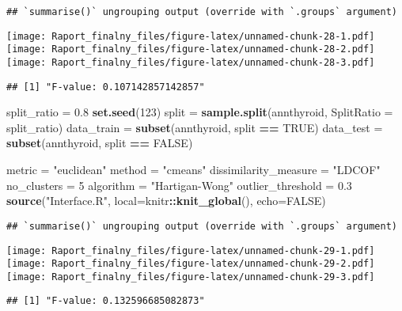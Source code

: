 \documentclass[
]{article}
\newenvironment{Shaded}{\begin{snugshade}}{\end{snugshade}}
\newcommand{\DataTypeTok}[1]{\textcolor[rgb]{0.13,0.29,0.53}{#1}}
\newcommand{\DecValTok}[1]{\textcolor[rgb]{0.00,0.00,0.81}{#1}}
\newcommand{\FloatTok}[1]{\textcolor[rgb]{0.00,0.00,0.81}{#1}}
\newcommand{\KeywordTok}[1]{\textcolor[rgb]{0.13,0.29,0.53}{\textbf{#1}}}
\newcommand{\NormalTok}[1]{#1}
\newcommand{\OperatorTok}[1]{\textcolor[rgb]{0.81,0.36,0.00}{\textbf{#1}}}
\newcommand{\OtherTok}[1]{\textcolor[rgb]{0.56,0.35,0.01}{#1}}
\newcommand{\StringTok}[1]{\textcolor[rgb]{0.31,0.60,0.02}{#1}}
\begin{document}
\begin{verbatim}
## `summarise()` ungrouping output (override with `.groups` argument)
\end{verbatim}

\texttt{[image: Raport\_finalny\_files/figure-latex/unnamed-chunk-28-1.pdf]}
\texttt{[image: Raport\_finalny\_files/figure-latex/unnamed-chunk-28-2.pdf]}
\texttt{[image: Raport\_finalny\_files/figure-latex/unnamed-chunk-28-3.pdf]}

\begin{verbatim}
## [1] "F-value: 0.107142857142857"
\end{verbatim}

\begin{Shaded}
\begin{Highlighting}[]
\NormalTok{split_ratio =}\StringTok{ }\FloatTok{0.8}
\KeywordTok{set.seed}\NormalTok{(}\DecValTok{123}\NormalTok{)}
\NormalTok{split =}\StringTok{ }\KeywordTok{sample.split}\NormalTok{(annthyroid, }\DataTypeTok{SplitRatio =}\NormalTok{ split_ratio)}
\NormalTok{data_train =}\StringTok{ }\KeywordTok{subset}\NormalTok{(annthyroid, split }\OperatorTok{==}\StringTok{ }\OtherTok{TRUE}\NormalTok{)}
\NormalTok{data_test =}\StringTok{ }\KeywordTok{subset}\NormalTok{(annthyroid, split }\OperatorTok{==}\StringTok{ }\OtherTok{FALSE}\NormalTok{)}

\NormalTok{metric =}\StringTok{ "euclidean"}
\NormalTok{method =}\StringTok{ "cmeans"}
\NormalTok{dissimilarity_measure =}\StringTok{ "LDCOF"}
\NormalTok{no_clusters =}\StringTok{ }\DecValTok{5}
\NormalTok{algorithm =}\StringTok{ "Hartigan-Wong"}
\NormalTok{outlier_threshold =}\StringTok{ }\FloatTok{0.3}
\KeywordTok{source}\NormalTok{(}\StringTok{"Interface.R"}\NormalTok{, }\DataTypeTok{local=}\NormalTok{knitr}\OperatorTok{::}\KeywordTok{knit_global}\NormalTok{(), }\DataTypeTok{echo=}\OtherTok{FALSE}\NormalTok{)}
\end{Highlighting}
\end{Shaded}

\begin{verbatim}
## `summarise()` ungrouping output (override with `.groups` argument)
\end{verbatim}

\texttt{[image: Raport\_finalny\_files/figure-latex/unnamed-chunk-29-1.pdf]}
\texttt{[image: Raport\_finalny\_files/figure-latex/unnamed-chunk-29-2.pdf]}
\texttt{[image: Raport\_finalny\_files/figure-latex/unnamed-chunk-29-3.pdf]}

\begin{verbatim}
## [1] "F-value: 0.132596685082873"
\end{verbatim}
\end{document}
